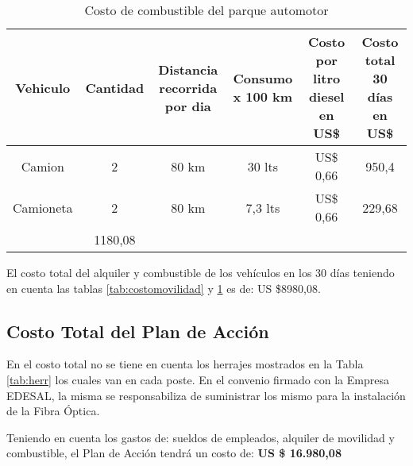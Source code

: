 \begin{table}[H]
  \centering
  \tiny
    \begin{tabular}{|c|c|c|c|c|c|}
    \hline
    \rowcolor[rgb]{ .773,  .851,  .945} \textbf{Vehiculo} & \textbf{Cantidad} & \textbf{Distancia recorrida por dia} & \textbf{Consumo x 100 km} & \textbf{Costo por litro diesel en US\$} & \textbf{Costo total 30 días en US\$} \bigstrut\\
    \hline
    Camion & 2     & 80 km & 30 lts & US\$ 0,66 & 950,4 \bigstrut\\
    \hline
    Camioneta & 2     & 80 km & 7,3 lts & US\$ 0,66 & 229,68 \bigstrut\\
    \hline
    \rowcolor[rgb]{ .773,  .851,  .945} \multicolumn{5}{|c|}{\textbf{Total}}  & \cellcolor[rgb]{ 1,  1,  1}1180,08 \bigstrut\\
    \hline
    \end{tabular}%
  \caption{Costo de combustible del parque automotor}
  \label{tab:costocombus}%
\end{table}%








El costo total del alquiler y combustible de los vehículos   en los 30 días teniendo en cuenta las tablas \ref{tab:costomovilidad} y \ref{tab:costocombus} es de: US \$8980,08.


\subsection{Costo Total del Plan de Acción}



En el costo total no se tiene en cuenta los herrajes mostrados en la Tabla \ref{tab:herr} los cuales van en cada poste. En el convenio firmado con la Empresa EDESAL, la misma se responsabiliza de suministrar los mismo para la instalación de la Fibra Óptica. 

Teniendo en cuenta los gastos de: sueldos de empleados, alquiler de movilidad y combustible, el Plan de Acción tendrá un costo de: \textbf{US \$ 16.980,08}

\newpage




